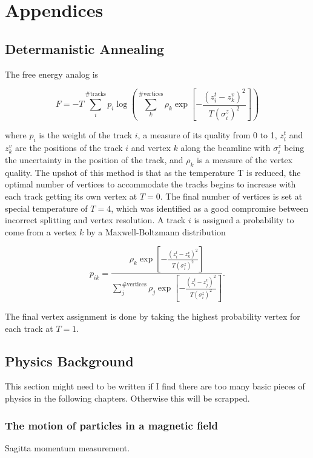 \chapter*{Appendices}

\section*{Determanistic Annealing}
  The free energy analog is

  \[
    F = -T \sum \limits_i^{\text{\# tracks}} p_i \log \left( \sum \limits_k^{\text{\# vertices}} \rho_k \exp \left[ -\frac{\left(z_i^t - z_k^v\right)^2}{T (\sigma_i^z)^2} \right] \right)
  \]

  where $p_i$ is the weight of the track $i$, a measure of its quality from 0 to 1, $z_i^t$ and $z_k^v$ are the positions of the track $i$ and vertex $k$ along the beamline with $\sigma_i^z$ being the uncertainty in the position of the track, and $\rho_k$ is a measure of the vertex quality. The upshot of this method is that as the temperature T is reduced, the optimal number of vertices to accommodate the tracks begins to increase with each track getting its own vertex at $T=0$. The final number of vertices is set at special temperature of $T=4$, which  was identified as a good compromise between incorrect splitting and vertex resolution. A track $i$ is assigned a probability to come from a vertex $k$ by a Maxwell-Boltzmann distribution 

  \[ 
    p_{ik} = \frac{\rho_k \exp \left[ -\frac{\left(z_i^t - z_k^v\right)^2}{T (\sigma_i^z)^2} \right]} { \sum \limits_j^{\text{\# vertices}} \rho_{j} \exp \left[ -\frac{\left(z_i^t - z_j^v\right)^2}{T (\sigma_i^z)^2} \right]}. 
  \]

  The final vertex assignment is done by taking the highest probability vertex for each track at $T=1$.

\section*{Physics Background}
  This section might need to be written if I find there are too many basic pieces of physics in the following chapters. Otherwise this will be scrapped.
  \subsection*{The motion of particles in a magnetic field} \label{sec:sagitta}
    Sagitta momentum measurement.

